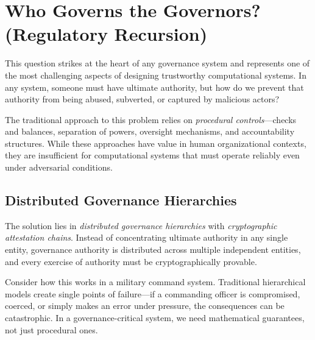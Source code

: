 \section{Who Governs the Governors? (Regulatory Recursion)}

This question strikes at the heart of any governance system and represents one of the most challenging aspects of designing trustworthy computational systems. In any system, someone must have ultimate authority, but how do we prevent that authority from being abused, subverted, or captured by malicious actors?

The traditional approach to this problem relies on \textit{procedural controls}—checks and balances, separation of powers, oversight mechanisms, and accountability structures. While these approaches have value in human organizational contexts, they are insufficient for computational systems that must operate reliably even under adversarial conditions.

\subsection{Distributed Governance Hierarchies}

The solution lies in \textit{distributed governance hierarchies} with \textit{cryptographic attestation chains}. Instead of concentrating ultimate authority in any single entity, governance authority is distributed across multiple independent entities, and every exercise of authority must be cryptographically provable.

Consider how this works in a military command system. Traditional hierarchical models create single points of failure—if a commanding officer is compromised, coerced, or simply makes an error under pressure, the consequences can be catastrophic. In a governance-critical system, we need mathematical guarantees, not just procedural ones.

